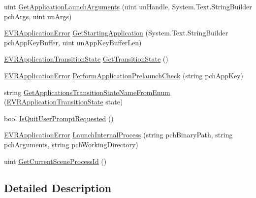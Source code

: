 \begin{DoxyCompactItemize}
\item 
uint \mbox{\hyperlink{class_valve_1_1_v_r_1_1_c_v_r_applications_a611d0f32e55ad2f8efda056a608ac678}{Get\+Application\+Launch\+Arguments}} (uint un\+Handle, System.\+Text.\+String\+Builder pch\+Args, uint un\+Args)
\item 
\mbox{\hyperlink{namespace_valve_1_1_v_r_a3488adab8a219b579fcee50f4e63a8b6}{E\+V\+R\+Application\+Error}} \mbox{\hyperlink{class_valve_1_1_v_r_1_1_c_v_r_applications_aa29b29431a7d099a1c81dfdf8b3be280}{Get\+Starting\+Application}} (System.\+Text.\+String\+Builder pch\+App\+Key\+Buffer, uint un\+App\+Key\+Buffer\+Len)
\item 
\mbox{\hyperlink{namespace_valve_1_1_v_r_af00430caae64a19e9ad612ac01a208c0}{E\+V\+R\+Application\+Transition\+State}} \mbox{\hyperlink{class_valve_1_1_v_r_1_1_c_v_r_applications_a0505122273189cf3ec0dd27a800f9e8c}{Get\+Transition\+State}} ()
\item 
\mbox{\hyperlink{namespace_valve_1_1_v_r_a3488adab8a219b579fcee50f4e63a8b6}{E\+V\+R\+Application\+Error}} \mbox{\hyperlink{class_valve_1_1_v_r_1_1_c_v_r_applications_a0cafe190f23f3170b18c68d3ae758d47}{Perform\+Application\+Prelaunch\+Check}} (string pch\+App\+Key)
\item 
string \mbox{\hyperlink{class_valve_1_1_v_r_1_1_c_v_r_applications_a9992ade2dba2f51d2aa4985bc23ceca6}{Get\+Applications\+Transition\+State\+Name\+From\+Enum}} (\mbox{\hyperlink{namespace_valve_1_1_v_r_af00430caae64a19e9ad612ac01a208c0}{E\+V\+R\+Application\+Transition\+State}} state)
\item 
bool \mbox{\hyperlink{class_valve_1_1_v_r_1_1_c_v_r_applications_af5244a52dc2ec469c188a3f20479b89e}{Is\+Quit\+User\+Prompt\+Requested}} ()
\item 
\mbox{\hyperlink{namespace_valve_1_1_v_r_a3488adab8a219b579fcee50f4e63a8b6}{E\+V\+R\+Application\+Error}} \mbox{\hyperlink{class_valve_1_1_v_r_1_1_c_v_r_applications_aecc547aa078162f39cc95d6eb7191f0d}{Launch\+Internal\+Process}} (string pch\+Binary\+Path, string pch\+Arguments, string pch\+Working\+Directory)
\item 
uint \mbox{\hyperlink{class_valve_1_1_v_r_1_1_c_v_r_applications_a978ad099c27b5b3984395bd42d5d56a4}{Get\+Current\+Scene\+Process\+Id}} ()
\end{DoxyCompactItemize}


\subsection{Detailed Description}


